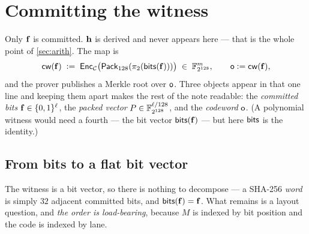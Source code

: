 \section{Committing the witness}\label{sec:commit}

Only $\mathbf{f}$ is committed. $\mathbf{h}$ is derived and never appears here --- that is the
whole point of \cref{sec:arith}. The map is
\begin{equation}\label{eq:cw}
  \mathsf{cw}(\mathbf{f}) \;\vcentcolon=\; \mathsf{Enc}_{\mathcal{C}}\bigl(\mathsf{Pack}_{128}(\pi_2(\mathsf{bits}(\mathbf{f})))\bigr)
  \;\in\;\mathbb{F}_{2^{128}}^{m},
  \qquad \mathsf{o} \vcentcolon= \mathsf{cw}(\mathbf{f}),
\end{equation}
and the prover publishes a Merkle root over $\mathsf{o}$. Three objects appear in that
one line and keeping them apart makes the rest of the note readable: the
\emph{committed bits} $\mathbf{f}\in\{0,1\}^{\ell}$, the \emph{packed vector}
$P\in\mathbb{F}_{2^{128}}^{\ell/128}$, and the \emph{codeword} $\mathsf{o}$. (A polynomial
witness would need a fourth --- the bit vector $\mathsf{bits}(\mathbf{f})$ --- but here
$\mathsf{bits}$ is the identity.)

\subsection{From bits to a flat bit vector}

The witness is a bit vector, so there is nothing to decompose --- a SHA-256
\emph{word} is simply $32$ adjacent committed bits, and $\mathsf{bits}(\mathbf{f})=\mathbf{f}$. What
remains is a layout question, and \emph{the order is load-bearing}, because $M$
is indexed by bit position and the code is indexed by lane.

